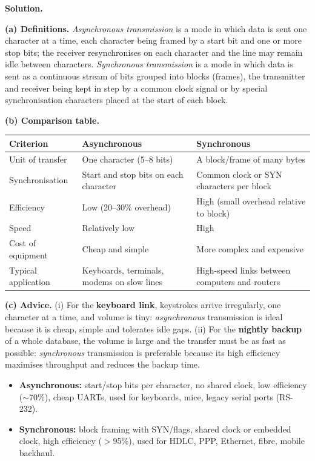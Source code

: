 \documentclass[11pt]{article}
\begin{document}
\begin{exoresolu}
\textbf{Solution.}

\textbf{(a) Definitions.} \emph{Asynchronous transmission} is a mode in which data is sent one character at a time, each character being framed by a start bit and one or more stop bits; the receiver resynchronises on each character and the line may remain idle between characters. \emph{Synchronous transmission} is a mode in which data is sent as a continuous stream of bits grouped into blocks (frames), the transmitter and receiver being kept in step by a common clock signal or by special synchronisation characters placed at the start of each block.

\textbf{(b) Comparison table.}
\begin{center}
\begin{tabularx}{\linewidth}{|l|X|X|}
\hline
\rowcolor{popblueL} \textbf{Criterion} & \textbf{Asynchronous} & \textbf{Synchronous} \\
\hline
Unit of transfer & One character (5--8 bits) & A block/frame of many bytes \\
\hline
Synchronisation & Start and stop bits on each character & Common clock or SYN characters per block \\
\hline
Efficiency & Low (20--30\% overhead) & High (small overhead relative to block) \\
\hline
Speed & Relatively low & High \\
\hline
Cost of equipment & Cheap and simple & More complex and expensive \\
\hline
Typical application & Keyboards, terminals, modems on slow lines & High-speed links between computers and routers \\
\hline
\end{tabularx}
\end{center}

\textbf{(c) Advice.} (i) For the \textbf{keyboard link}, keystrokes arrive irregularly, one character at a time, and volume is tiny: \emph{asynchronous} transmission is ideal because it is cheap, simple and tolerates idle gaps. (ii) For the \textbf{nightly backup} of a whole database, the volume is large and the transfer must be as fast as possible: \emph{synchronous} transmission is preferable because its high efficiency maximises throughput and reduces the backup time.
\end{exoresolu}

\begin{aretenir}
\begin{itemize}
\item \textbf{Asynchronous:} start/stop bits per character, no shared clock, low efficiency ($\sim$70\%), cheap UARTs, used for keyboards, mice, legacy serial ports (RS-232).
\item \textbf{Synchronous:} block framing with SYN/flags, shared clock or embedded clock, high efficiency ($>$95\%), used for HDLC, PPP, Ethernet, fibre, mobile backhaul.
\end{itemize}
\end{aretenir}
\end{document}
